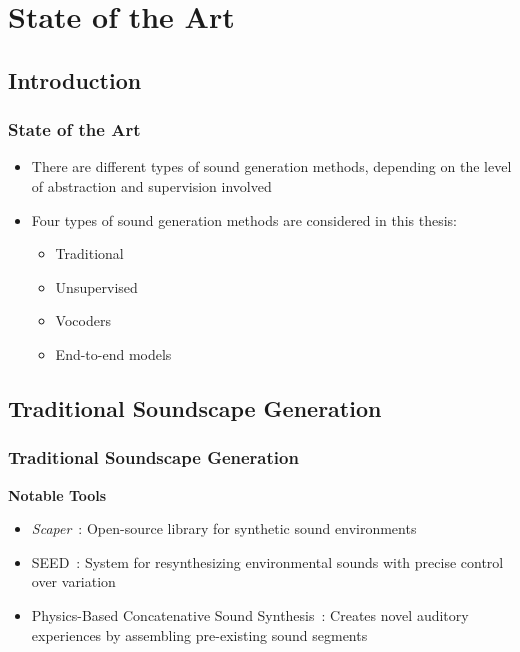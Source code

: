 \section{State of the Art}

\subsection{Introduction}
\begin{frame}
    \frametitle{State of the Art}
    \begin{itemize}
        \item There are different types of sound generation methods, depending on the level of abstraction and supervision involved
        \item Four types of sound generation methods are considered in this thesis:
              \begin{itemize}
                  \item Traditional
                  \item Unsupervised
                  \item Vocoders
                  \item End-to-end models
              \end{itemize}
    \end{itemize}
\end{frame}

\subsection{Traditional Soundscape Generation}

\begin{frame}
    \frametitle{Traditional Soundscape Generation}

    \textbf{Notable Tools}
    \begin{itemize}
        \item \textit{Scaper}~\cite{salamon_scaper_2017}: Open-source library for synthetic sound environments
        \item SEED~\cite{bernardes_seed_2016}: System for resynthesizing environmental sounds with precise control over variation
        \item Physics-Based Concatenative Sound Synthesis~\cite{magalhaes_physics-based_2020}: Creates novel auditory experiences by assembling pre-existing sound segments
    \end{itemize}
\end{frame}

